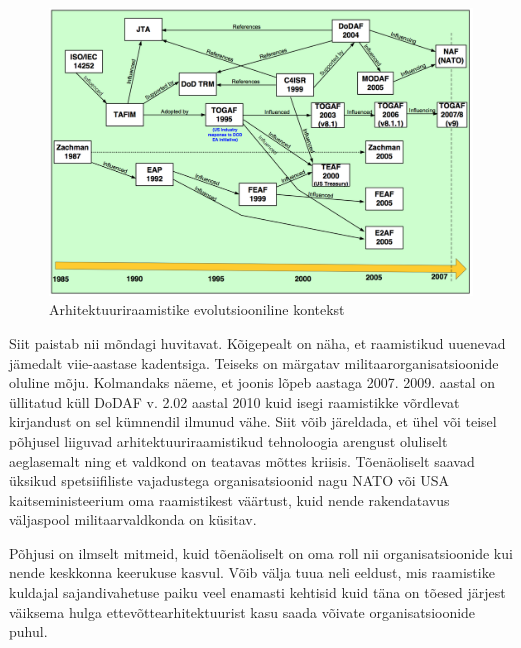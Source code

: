 \begin{figure}%
	\begin{center}
		\includegraphics[width=\linewidth]{eaevolution.png}
		\caption{Arhitektuuriraamistike evolutsiooniline kontekst}
		\label{fig:architecture:EA}
	\end{center}
\end{figure}

Siit paistab nii mõndagi huvitavat. Kõigepealt on näha, et raamistikud uuenevad jämedalt viie-aastase kadentsiga. Teiseks on märgatav militaarorganisatsioonide oluline mõju. Kolmandaks näeme, et joonis lõpeb aastaga 2007. 2009. aastal on üllitatud küll DoDAF v. 2.02 aastal 2010 kuid isegi raamistikke võrdlevat kirjandust on sel kümnendil ilmunud vähe. Siit võib järeldada, et ühel või teisel põhjusel liiguvad arhitektuuriraamistikud tehnoloogia arengust oluliselt aeglasemalt ning et valdkond on teatavas mõttes kriisis. Tõenäoliselt saavad üksikud spetsiifiliste vajadustega organisatsioonid nagu NATO või USA kaitseministeerium oma raamistikest väärtust, kuid nende rakendatavus väljaspool militaarvaldkonda on küsitav. 

Põhjusi on ilmselt mitmeid, kuid tõenäoliselt on oma roll nii organisatsioonide kui nende keskkonna keerukuse kasvul. Võib välja tuua neli eeldust, mis raamistike kuldajal sajandivahetuse paiku veel enamasti kehtisid kuid täna on tõesed järjest väiksema hulga ettevõttearhitektuurist kasu saada võivate organisatsioonide puhul.

